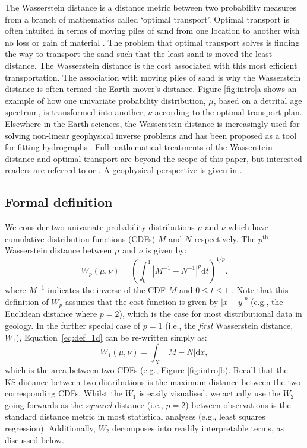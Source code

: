 \documentclass[gchron, manuscript]{article}
\begin{document}
The Wasserstein distance is a distance metric between two probability measures from a branch of mathematics called `optimal transport'. Optimal transport is often intuited in terms of moving piles of sand from one location to another with no loss or gain of material \citep[e.g.,][]{villani_topics_2003}. The problem that optimal transport solves is finding the way to transport the sand such that the least sand is moved the least distance. The Wasserstein distance is the cost associated with this most efficient transportation. The association with moving piles of sand is why the Wasserstein distance is often termed the Earth-mover's distance. Figure \ref{fig:intro}a shows an example of how one univariate probability distribution, $\mu$, based on a detrital age spectrum, is transformed into another, $\nu$ according to the optimal transport plan. Elsewhere in the Earth sciences, the Wasserstein distance is increasingly used for solving non-linear geophysical inverse problems \citep[e.g.,][]{engquist_application_2014,metivier_optimal_2016,sambridge_geophysical_2022} and has been proposed as a tool for fitting hydrographs \citep{magyar_hydrological_2023}. Full mathematical treatments of the Wasserstein distance and optimal transport are beyond the scope of this paper, but interested readers are referred to \cite{villani_topics_2003} or \cite{peyre_computational_2019}. A geophysical perspective is given in \cite{sambridge_geophysical_2022}. 

\subsection{Formal definition}

We consider two univariate probability distributions $\mu$ and $\nu$ which have cumulative distribution functions (CDFs) $M$ and $N$ respectively. The $p^{\mathrm{th}}$ Wasserstein distance between $\mu$ and $\nu$ is given by: 
\begin{equation}
        W_p(\mu, \nu) = \left(\int_0^1 | M^{-1} - N^{-1} |^p \mathrm{d}t\right)^{1/p}. 
    \label{eq:def_1d}
\end{equation} 
\noindent where $M^{-1}$ indicates the inverse of the CDF $M$ and $0 \leq t \leq 1$ \citep{villani_topics_2003}. Note that this definition of $W_p$ assumes that the cost-function is given by $|x-y|^p$ (e.g., the Euclidean distance where $p=2$), which is the case for most distributional data in geology. In the further special case of $p=1$ (i.e., the \textit{first} Wasserstein distance, $W_1$), Equation~\ref{eq:def_1d} can be re-written simply as: 
\begin{equation}
        W_1 (\mu, \nu) = \int_X | M - N| \mathrm{d}x, 
    \label{eq:def_1d_ecdf}
\end{equation} 
\noindent which is the area between two CDFs (e.g., Figure \ref{fig:intro}b). Recall that the KS-distance between two distributions is the maximum distance between the two corresponding CDFs. Whilst the $W_1$ is easily visualised, we actually use the $W_2$ going forwards as the \textit{squared} distance (i.e., $p=2$) between observations is the standard distance metric in most statistical analyses (e.g., least squares regression). Additionally, $W_2$ decomposes into readily interpretable terms, as discussed below. 
\end{document}
